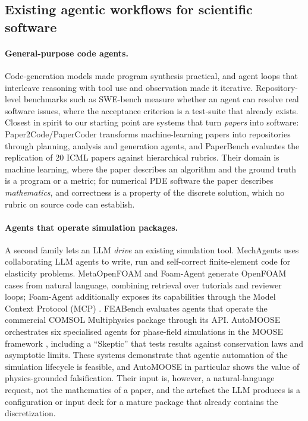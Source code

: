 \subsection{Existing agentic workflows for scientific software}
\label{sec:review}

\paragraph{General-purpose code agents.}
Code-generation models \citep{codex2021} made program synthesis practical, and agent loops that interleave reasoning with tool use and observation \citep{react2023,reflexion2023} made it iterative. Repository-level benchmarks such as SWE-bench \citep{swebench2024} measure whether an agent can resolve real software issues, where the acceptance criterion is a test-suite that already exists. Closest in spirit to our starting point are systems that turn \emph{papers} into software: Paper2Code/PaperCoder \citep{paper2code2025} transforms machine-learning papers into repositories through planning, analysis and generation agents, and PaperBench \citep{paperbench2025} evaluates the replication of 20 ICML papers against hierarchical rubrics. Their domain is machine learning, where the paper describes an algorithm and the ground truth is a program or a metric; for numerical PDE software the paper describes \emph{mathematics}, and correctness is a property of the discrete solution, which no rubric on source code can establish.

\paragraph{Agents that operate simulation packages.}
A second family lets an LLM \emph{drive} an existing simulation tool. MechAgents \citep{mechagents2023} uses collaborating LLM agents to write, run and self-correct finite-element code for elasticity problems. MetaOpenFOAM \citep{metaopenfoam2024} and Foam-Agent \citep{foamagent2026} generate OpenFOAM cases from natural language, combining retrieval over tutorials and reviewer loops; Foam-Agent additionally exposes its capabilities through the Model Context Protocol (MCP) \citep{mcp2024}. FEABench \citep{feabench2025} evaluates agents that operate the commercial COMSOL Multiphysics package through its API. AutoMOOSE \citep{automoose2026} orchestrates six specialised agents for phase-field simulations in the MOOSE framework \citep{permann2020}, including a ``Skeptic'' that tests results against conservation laws and asymptotic limits. These systems demonstrate that agentic automation of the simulation lifecycle is feasible, and AutoMOOSE in particular shows the value of physics-grounded falsification. Their input is, however, a natural-language request, not the mathematics of a paper, and the artefact the LLM produces is a configuration or input deck for a mature package that already contains the discretization.

